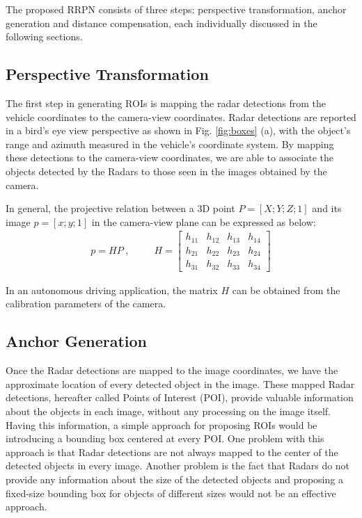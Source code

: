 \documentclass{article}
\begin{document}
The proposed RRPN consists of three steps: perspective transformation, anchor generation 
and distance compensation, each individually discussed in the following 
sections.

\subsection{Perspective Transformation}
\label{sec:persTrans}
The first step in generating ROIs is mapping the radar 
detections from the vehicle coordinates to the camera-view coordinates. Radar 
detections are reported in a bird's eye view perspective as shown in 
Fig. \ref{fig:boxes} (a), with the object's range and azimuth measured in the 
vehicle's coordinate system. By mapping these detections to the camera-view coordinates, 
we are able to associate the objects detected by the Radars to those seen in the 
images obtained by the camera.

In general, the projective relation between a 3D point $P =[X; Y; Z; 1]$ and its image
$p =[x; y; 1]$ in the camera-view plane can be expressed as below:
\begin{gather}
  p = HP  \hspace{3pt}, \hspace{30pt}
  H = \begin{bmatrix}
    h_{11} & h_{12} & h_{13} & h_{14} \\
    h_{21} & h_{22} & h_{23} & h_{24}\\
    h_{31} & h_{32} & h_{33} & h_{34}
  \end{bmatrix}
\label{eq:Transform}
\end{gather}

In an autonomous driving application, the matrix $H$ can be obtained from the calibration 
parameters of the camera.

\subsection{Anchor Generation}
Once the Radar detections are mapped to the image coordinates, we have the 
approximate location of every detected object in the image. These mapped Radar 
detections, hereafter called Points of Interest (POI), provide valuable 
information about the objects in each image, without any processing on the image 
itself. Having this information, a simple approach for proposing ROIs 
would be introducing a bounding box centered at every POI. One problem with this 
approach is that Radar detections are not always mapped to the center of the 
detected objects in every image. Another problem is the fact that Radars do not provide 
any information about the size of the detected objects and proposing a fixed-size 
bounding box for objects of different sizes would not be an effective approach.
\end{document}
